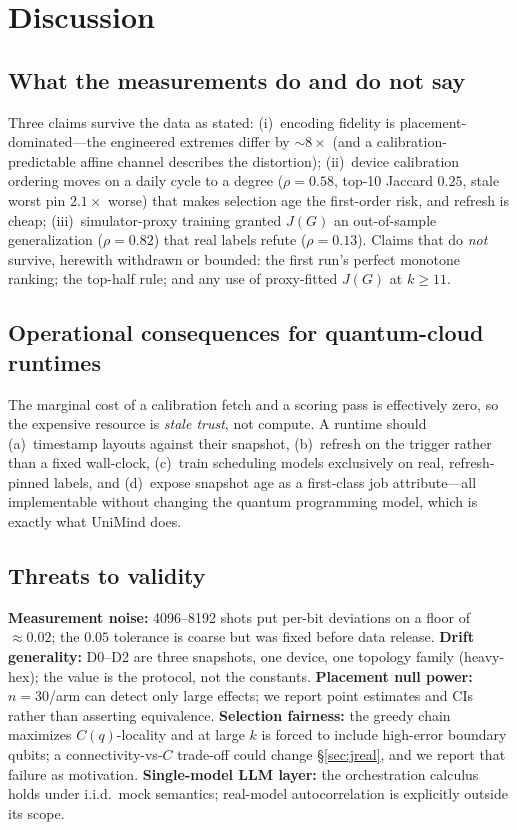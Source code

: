 \documentclass[journal,10pt,twocolumn]{IEEEtran}
\begin{document}
\section{Discussion}
\label{sec:discussion}
\subsection{What the measurements do and do not say}
Three claims survive the data as stated: (i)~encoding fidelity is placement-dominated---the engineered extremes
differ by $\sim8\times$ (and a calibration-predictable affine channel describes the distortion); (ii)~device
calibration ordering moves on a daily cycle to a degree ($\rho{=}0.58$, top-10 Jaccard $0.25$, stale worst pin
$2.1\times$ worse) that makes selection age the first-order risk, and refresh is cheap; (iii)~simulator-proxy
training granted $J(G)$ an out-of-sample generalization ($\rho{=}0.82$) that real labels refute
($\rho{=}0.13$). Claims that do \emph{not} survive, herewith withdrawn or bounded: the first run's perfect monotone
ranking; the top-half rule; and any use of proxy-fitted $J(G)$ at $k\ge11$.

\subsection{Operational consequences for quantum-cloud runtimes}
The marginal cost of a calibration fetch and a scoring pass is effectively zero, so the expensive resource is
\emph{stale trust}, not compute. A runtime should (a)~timestamp layouts against their snapshot, (b)~refresh on the
trigger rather than a fixed wall-clock, (c)~train scheduling models exclusively on real, refresh-pinned labels, and
(d)~expose snapshot age as a first-class job attribute---all implementable without changing the quantum programming
model, which is exactly what UniMind does.

\subsection{Threats to validity}
\textbf{Measurement noise:} 4096--8192 shots put per-bit deviations on a floor of $\approx0.02$; the $0.05$
tolerance is coarse but was fixed before data release. \textbf{Drift generality:} D0--D2 are three snapshots, one
device, one topology family (heavy-hex); the value is the protocol, not the constants. \textbf{Placement null
power:} $n{=}30$/arm can detect only large effects; we report point estimates and CIs rather than asserting
equivalence. \textbf{Selection fairness:} the greedy chain maximizes $C(q)$-locality and at large $k$ is forced to
include high-error boundary qubits; a connectivity-vs-$C$ trade-off could change \S\ref{sec:jreal}, and we report
that failure as motivation. \textbf{Single-model LLM layer:} the orchestration calculus holds under i.i.d.\ mock
semantics; real-model autocorrelation is explicitly outside its scope.
\end{document}
